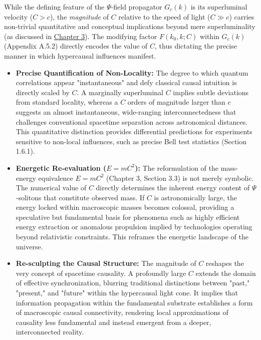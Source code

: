 \documentclass{report}
\begin{document}
While the defining feature of the $\Psi$-field propagator $G_c(k)$ is its superluminal velocity ($C > c$), the \emph{magnitude} of $C$ relative to the speed of light ($C \gg c$) carries non-trivial quantitative and conceptual implications beyond mere superluminality (as discussed in \hyperref[chap:hypercausal]{Chapter 3}). The modifying factor $F(k_0, k; C)$ within $G_c(k)$ (Appendix A.5.2) directly encodes the value of $C$, thus dictating the precise manner in which hypercausal influences manifest.

\begin{itemize}
    \item \textbf{Precise Quantification of Non-Locality:} The degree to which quantum correlations appear "instantaneous" and defy classical causal intuition is directly scaled by $C$. A marginally superluminal $C$ implies subtle deviations from standard locality, whereas a $C$ orders of magnitude larger than $c$ suggests an almost instantaneous, wide-ranging interconnectedness that challenges conventional spacetime separation across astronomical distances. This quantitative distinction provides differential predictions for experiments sensitive to non-local influences, such as precise Bell test statistics (Section 1.6.1).
    \item \textbf{Energetic Re-evaluation ($E=mC^2$):} The reformulation of the mass-energy equivalence $E=mC^2$ (Chapter 3, Section 3.3) is not merely symbolic. The numerical value of $C$ directly determines the inherent energy content of $\Psi$-solitons that constitute observed mass. If $C$ is astronomically large, the energy locked within macroscopic masses becomes colossal, providing a speculative but fundamental basis for phenomena such as highly efficient energy extraction or anomalous propulsion implied by technologies operating beyond relativistic constraints. This reframes the energetic landscape of the universe.
    \item \textbf{Re-sculpting the Causal Structure:} The magnitude of $C$ reshapes the very concept of spacetime causality. A profoundly large $C$ extends the domain of effective synchronization, blurring traditional distinctions between "past," "present," and "future" within the hypercausal light cone. It implies that information propagation within the fundamental substrate establishes a form of macroscopic causal connectivity, rendering local approximations of causality less fundamental and instead emergent from a deeper, interconnected reality.
\end{itemize}
\end{document}

